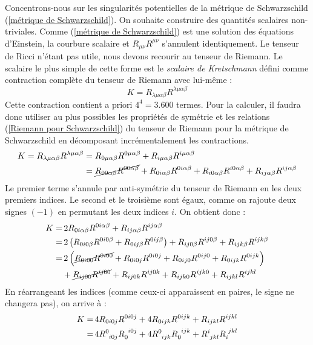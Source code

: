 Concentrons-nous sur les singularités potentielles de la métrique de Schwarzschild (\ref{métrique de Schwarzschild}). On souhaite construire des quantités scalaires non-triviales. Comme (\ref{métrique de Schwarzschild}) est une solution des équations d'Einstein, la courbure scalaire et $R_{\mu\nu} R^{\mu\nu}$ s'annulent identiquement. Le tenseur de Ricci n'étant pas utile, nous devons recourir au tenseur de Riemann. Le scalaire le plus simple de cette forme est le \emph{scalaire de Kretschmann} défini comme contraction complète du tenseur de Riemann avec lui-même :
\begin{equation}
    K = R_{\lambda \mu \alpha \beta} R^{\lambda\mu\alpha\beta}
\end{equation}
Cette contraction contient a priori $4^4 = 3.600$ termes. Pour la calculer, il faudra donc utiliser au plus possibles les propriétés de symétrie et les relations (\ref{Riemann pour Schwarzschild}) du tenseur de Riemann pour la métrique de Schwarzschild en décomposant incrémentalement les contractions.
\begin{align}
    K = R_{\lambda\mu\alpha\beta} R^{\lambda\mu\alpha\beta} &= R_{0 \mu \alpha\beta} R^{0\mu\alpha\beta} + R_{i\mu\alpha\beta} R^{i\mu\alpha\beta}\\
    &= \cancel{R_{00\alpha\beta} R^{00\alpha\beta}} + R_{0i\alpha\beta} R^{0i\alpha\beta} + R_{i0\alpha\beta} R^{i0\alpha\beta} + R_{ij\alpha\beta} R^{ij\alpha\beta}
\end{align}
Le premier terme s'annule par anti-symétrie du tenseur de Riemann en les deux premiers indices. Le second et le troisième sont égaux, comme on rajoute deux signes $(-1)$ en permutant les deux indices $i$. On obtient donc :
\begin{align}
    K =& \, 2 R_{0 i\alpha\beta} R^{0 i\alpha\beta} + R_{ij\alpha\beta} R^{ij\alpha\beta}\\
    =& \,  2 \left( R_{0 i 0\beta} R^{0 i0\beta} + R_{0 ij\beta} R^{0 ij\beta} \right)  + R_{ij0\beta} R^{ij0\beta} + R_{ijk\beta} R^{ijk\beta} \\
    =& \,2 \left( \cancel{R_{0 i 00} R^{0 i00}} +  R_{0 i 0j} R^{0 i0j} + R_{0 ij0} R^{0 ij0} + R_{0 ijk} R^{0 ijk}\right) \\
    &+ \cancel{R_{ij00} R^{ij00}} + R_{ij0k} R^{ij0k} + R_{ijk0} R^{ijk0} + R_{ijkl} R^{ijkl} 
\end{align}
En réarrangeant les indices (comme ceux-ci apparaissent en paires, le signe ne changera pas), on arrive à :
\begin{align}
    K =& \, 4  R_{0 i 0j} R^{0 i0j} + 4 R_{0 ijk} R^{0 ijk} + R_{ijkl} R^{ijkl} \\
    =& \, 4  R\indices{^0_{i 0j}} R\indices{_0^{ i0j}} + 4 R\indices{^0_{ ijk}} R\indices{_0^{ ijk}} + R\indices{^i_{jkl}} R\indices{_i^{jkl}}
\end{align}
